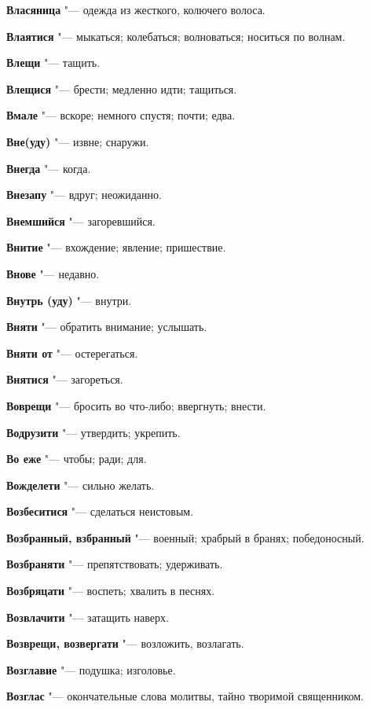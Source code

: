 \begin{mymulticols}
\noindent\textbf{Власяница} "--- одежда из жесткого, колючего волоса. 

\noindent\textbf{Влаятися} "--- мыкаться; колебаться; волноваться; носиться по волнам. 

\noindent\textbf{Влещи} "--- тащить. 

\noindent\textbf{Влещися} "--- брести; медленно идти; тащиться. 

\noindent\textbf{Вмале} "--- вскоре; немного спустя; почти; едва. 

\noindent\textbf{Вне(уду)} "--- извне; снаружи. 

\noindent\textbf{Внегда} "--- когда. 

\noindent\textbf{Внезапу} "--- вдруг; неожиданно. 

\noindent\textbf{Внемшийся} "--- загоревшийся. 

\noindent\textbf{Внитие} "--- вхождение; явление; пришествие. 

\noindent\textbf{Внове} "--- недавно. 

\noindent\textbf{Внутрь (уду)} "--- внутри. 

\noindent\textbf{Вняти} "--- обратить внимание; услышать. 

\noindent\textbf{Вняти от} "--- остерегаться. 

\noindent\textbf{Внятися} "--- загореться. 

\noindent\textbf{Воврещи} "--- бросить во что-либо; ввергнуть; внести. 

\noindent\textbf{Водрузити} "--- утвердить; укрепить. 

\noindent\textbf{Во еже} "--- чтобы; ради; для. 

\noindent\textbf{Вожделети} "--- сильно желать. 

\noindent\textbf{Возбеситися} "--- сделаться неистовым. 

\noindent\textbf{Возбранный, взбранный} "--- военный; храбрый в бранях; победоносный. 

\noindent\textbf{Возбраняти} "--- препятствовать; удерживать. 

\noindent\textbf{Возбряцати} "--- воспеть; хвалить в песнях. 

\noindent\textbf{Возвлачити} "--- затащить наверх. 

\noindent\textbf{Возврещи, возвергати} "--- возложить, возлагать. 

\noindent\textbf{Возглавие} "--- подушка; изголовье. 

\noindent\textbf{Возглас} "--- окончательные слова молитвы, тайно творимой священником. 


\end{mymulticols}
